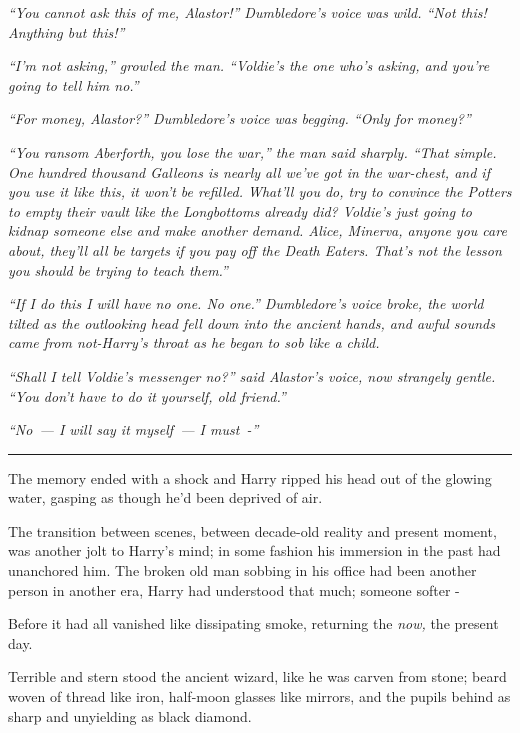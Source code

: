 \emph{``You cannot ask this of me, Alastor!'' Dumbledore's voice was wild. ``Not this! Anything but this!''}

\emph{``I'm not asking,'' growled the man. ``Voldie's the one who's asking, and you're going to tell him no.''}

\emph{``For money, Alastor?'' Dumbledore's voice was begging. ``Only for money?''}

\emph{``You ransom Aberforth, you lose the war,'' the man said sharply. ``That simple. One hundred thousand Galleons is nearly all we've got in the war-chest, and if you use it like this, it won't be refilled. What'll you do, try to convince the Potters to empty their vault like the Longbottoms already did? Voldie's just going to kidnap someone else and make another demand. Alice, Minerva, anyone you care about, they'll all be targets if you pay off the Death Eaters. That's not the lesson you should be trying to teach them.''}

\emph{``If I do this I will have no one. No one.'' Dumbledore's voice broke, the world tilted as the outlooking head fell down into the ancient hands, and awful sounds came from not-Harry's throat as he began to sob like a child.}

\emph{``Shall I tell Voldie's messenger no?'' said Alastor's voice, now strangely gentle. ``You don't have to do it yourself, old friend.''}

\emph{``No~--- I will say it myself~--- I must~-''}

\begin{center}\rule{3in}{0.4pt}\end{center}

The memory ended with a shock and Harry ripped his head out of the glowing water, gasping as though he'd been deprived of air.

The transition between scenes, between decade-old reality and present moment, was another jolt to Harry's mind; in some fashion his immersion in the past had unanchored him. The broken old man sobbing in his office had been another person in another era, Harry had understood that much; someone softer -

Before it had all vanished like dissipating smoke, returning the \emph{now,} the present day.

Terrible and stern stood the ancient wizard, like he was carven from stone; beard woven of thread like iron, half-moon glasses like mirrors, and the pupils behind as sharp and unyielding as black diamond.


